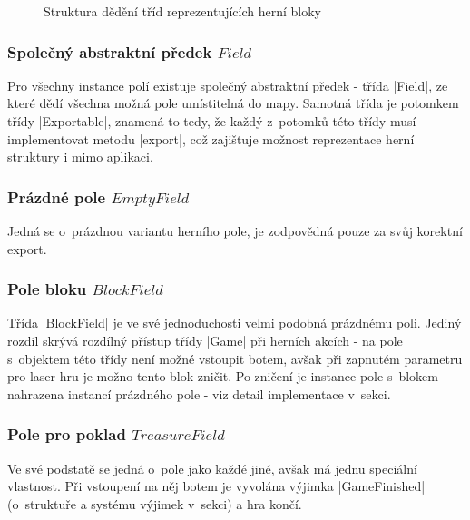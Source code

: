 \begin{figure}[h]
    \centering
    
    \caption{Struktura dědění tříd reprezentujících herní bloky}
    \label{fig:fields-uml}
\end{figure}

\subsubsection{Společný abstraktní předek $Field$}

\begin{sloppypar}
	Pro všechny instance polí existuje společný abstraktní předek - třída \ic|Field|, ze které dědí všechna možná pole umístitelná do mapy. Samotná třída je potomkem třídy \ic|Exportable|, znamená to tedy, že každý z~potomků této třídy musí implementovat metodu \ic|export|, což zajištuje možnost reprezentace herní struktury i mimo aplikaci.
\end{sloppypar}

\subsubsection{Prázdné pole $EmptyField$}

Jedná se o~prázdnou variantu herního pole, je zodpovědná pouze za svůj korektní export.

\subsubsection{Pole bloku $BlockField$}

Třída \ic|BlockField| je ve své jednoduchosti velmi podobná prázdnému poli. Jediný rozdíl skrývá rozdílný přístup třídy \ic|Game| při herních akcích - na pole s~objektem této třídy není možné vstoupit botem, avšak při zapnutém parametru pro laser hru je možno tento blok zničit. Po zničení je instance pole s~blokem nahrazena instancí prázdného pole - viz detail implementace v~sekci.

\subsubsection{Pole pro poklad $TreasureField$}

Ve své podstatě se jedná o~pole jako každé jiné, avšak má jednu speciální vlastnost. Při vstoupení na něj botem je vyvolána výjimka \ic|GameFinished| (o~struktuře a systému výjimek v~sekci) a hra končí. 

